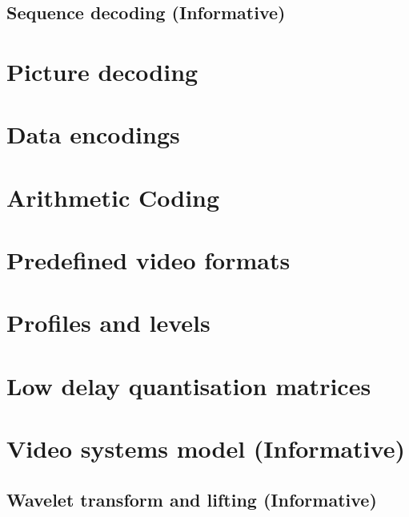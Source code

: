 \clearpage
\begin{informative*}
\section{Sequence decoding (Informative)}
\end{informative*}
\clearpage
\section{Picture decoding}






\appendix
\section{Data encodings}

\clearpage
\section{Arithmetic Coding}

\clearpage
\section{Predefined video formats}

\clearpage
\section{Profiles and levels}

\clearpage
\section{Low delay quantisation matrices}


\clearpage
\section{Video systems model (Informative)}


\clearpage
\begin{informative*}
\section{Wavelet transform and lifting (Informative)}

\end{informative*}



